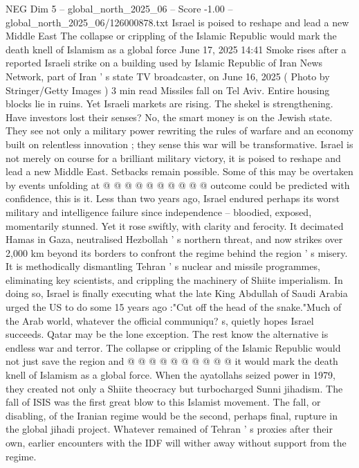 \begin{textsample}{NEG Dim 5 – global\_north\_2025\_06 – Score -1.00 – global\_north\_2025\_06/126000878.txt}  \label{ex:f5_neg_371}
Israel is poised to reshape and lead a new Middle East The collapse or crippling of the Islamic Republic would mark the death knell of Islamism as a global force June 17, 2025 14:41 Smoke rises after a reported Israeli strike on a building used by Islamic Republic of Iran News Network, part of Iran ' s state TV broadcaster, on June 16, 2025 ( Photo by Stringer/Getty Images ) 3 min read Missiles fall on Tel Aviv.
Entire housing blocks lie in ruins.
Yet Israeli markets are rising.
The shekel is strengthening.
Have investors lost their senses?
No, the smart money is on the Jewish state.
They see not only a military power rewriting the rules of warfare and an economy built on relentless innovation ; they sense this war will be transformative.
Israel is not merely on course for a brilliant military victory, it is poised to reshape and lead a new Middle East.
Setbacks remain possible.
Some of this may be overtaken by events unfolding at @ @ @ @ @ @ @ @ @ @ outcome could be predicted with confidence, this is it.
Less than two years ago, Israel endured perhaps its worst military and intelligence failure since independence -- bloodied, exposed, momentarily stunned.
Yet it rose swiftly, with clarity and ferocity.
It decimated Hamas in Gaza, neutralised Hezbollah ' s northern threat, and now strikes over 2,000 km beyond its borders to confront the regime behind the region ' s misery.
It is methodically dismantling Tehran ' s nuclear and missile programmes, eliminating key scientists, and crippling the machinery of Shiite imperialism.
In doing so, Israel is finally executing what the late King Abdullah of Saudi Arabia urged the US to do some 15 years ago :"Cut off the head of the snake."Much of the Arab world, whatever the official communiqu? s, quietly hopes Israel succeeds.
Qatar may be the lone exception.
The rest know the alternative is endless war and terror.
The collapse or crippling of the Islamic Republic would not just save the region and @ @ @ @ @ @ @ @ @ @ it would mark the death knell of Islamism as a global force.
When the ayatollahs seized power in 1979, they created not only a Shiite theocracy but turbocharged Sunni jihadism.
The fall of ISIS was the first great blow to this Islamist movement.
The fall, or disabling, of the Iranian regime would be the second, perhaps final, rupture in the global jihadi project.
Whatever remained of Tehran ' s proxies after their own, earlier encounters with the IDF will wither away without support from the regime.

\end{textsample}
